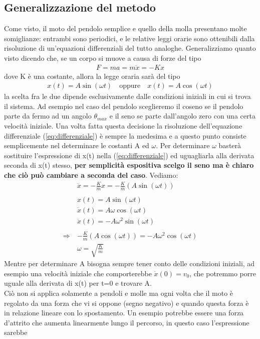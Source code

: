 \subsection{Generalizzazione del metodo}
Come visto, il moto del pendolo semplice e quello della molla presentano molte somiglianze: entrambi sono periodici, e le relative leggi orarie sono ottenibili dalla risoluzione di un'equazioni differenziali del tutto analoghe. Generalizziamo quanto visto dicendo che, se un corpo si muove a causa di forze del tipo
\begin{align}\label{eq:differenziale}
	F= ma = m \ddot{x} = -K x
\end{align}
dove K è una costante, allora la legge oraria sarà del tipo
\begin{align*}
	x(t) = A\sin(\omega t) \quad \text{oppure} \quad x(t) = A\cos(\omega t)
\end{align*}
la scelta fra le due dipende esclusivamente dalle condizioni iniziali in cui si trova il sistema. Ad esempio nel caso del pendolo sceglieremo il coseno se il pendolo parte da fermo ad un angolo $\theta_{max}$ e il seno se parte dall'angolo zero con una certa velocità iniziale. Una volta fatta questa decisione la risoluzione dell'equazione differenziale (\ref{eq:differenziale}) è sempre la medesima e a questo punto consiste semplicemente nel determinare le costanti A ed $\omega$. Per determinare $\omega$ basterà sostituire l'espressione di x(t) nella (\ref{eq:differenziale}) ed uguagliarla alla derivata seconda di x(t) stesso, \textbf{per semplicità espositiva scelgo il seno ma è chiaro che ciò può cambiare a seconda del caso}. Vediamo:
\begin{align*}
	&\ddot{x} = -\frac{K}{m} x = -\frac{K}{m}(A\sin(\omega t))\\\\
	&x(t) = A\sin(\omega t)\\
	&\dot{x}(t) = A\omega\cos(\omega t)\\
	&\ddot{x}(t) = -A\omega^2 \sin(\omega t)\\\\
	\Rightarrow\ &-\frac{K}{m}(A\cos(\omega t)) =  -A\omega^2 \cos (\omega t)\\
	&\omega = \sqrt{\frac{K}{m}}
\end{align*} 
Mentre per determinare A bisogna sempre tener conto delle condizioni iniziali, ad esempio una velocità iniziale che comporterebbe $\dot{x}(0)= v_0$, che potremmo porre uguale alla derivata di x(t) per t=0 e trovare A.\\
Ciò non si applica solamente a pendoli e molle ma ogni volta che il moto è regolato da una forza che vi si oppone (segno negativo) e quando questa forza è in relazione lineare con lo spostamento. Un esempio potrebbe essere una forza d'attrito che aumenta linearmente lungo il percorso, in questo caso l'espressione sarebbe
